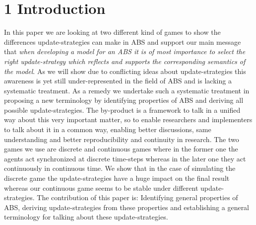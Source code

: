 \section{1 Introduction}
In this paper we are looking at two different kind of games to show the differences update-strategies can make in ABS and support our main message that \textit{when developing a model for an ABS it is of most importance to select the right update-strategy which reflects and supports the corresponding semantics of the model}. As we will show due to conflicting ideas about update-strategies this awareness is yet still under-represented in the field of ABS and is lacking a systematic treatment. As a remedy we undertake such a systematic treatment in proposing a new terminology by identifying properties of ABS and deriving all possible update-strategies. The by-product is a framework to talk in a unified way about this very important matter, so to enable researchers and implementers to talk about it in a common way, enabling better discussions, same understanding and better reproducibility and continuity in research.
The two games we use are discrete and continuous games where in the former one the agents act synchronized at discrete time-steps whereas in the later one they act continuously in continuous time. We show that in the case of simulating the discrete game the update-strategies have a huge impact on the final result whereas our continuous game seems to be stable under different update-strategies. The contribution of this paper is: Identifying general properties of ABS, deriving update-strategies from these properties and establishing a general terminology for talking about these update-strategies.